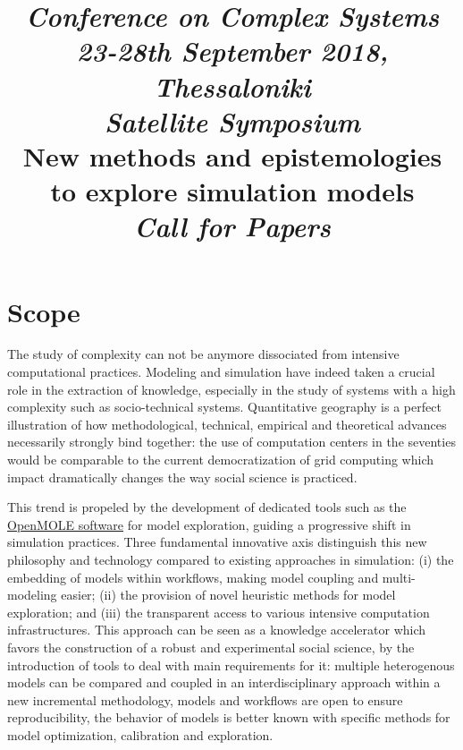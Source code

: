 \documentclass[11pt]{article}
\begin{document}
% 



\title{
\textit{Conference on Complex Systems}\medskip\\
\textit{23-28th September 2018, Thessaloniki}\vspace{1cm}\\
\textit{Satellite Symposium}\medskip\\
New methods and epistemologies to explore simulation models\medskip\\
\textit{Call for Papers}
}

\date{}

\maketitle

\justify




\section*{Scope}

The study of complexity can not be anymore dissociated from intensive computational practices. Modeling and simulation have indeed taken a crucial role in the extraction of knowledge, especially in the study of systems with a high complexity such as socio-technical systems. Quantitative geography is a perfect illustration of how methodological, technical, empirical and theoretical advances necessarily strongly bind together: the use of computation centers in the seventies would be comparable to the current democratization of grid computing which impact dramatically changes the way social science is practiced. 

\medskip

This trend is propeled by the development of dedicated tools such as the \href{http://openmole.org/}{OpenMOLE software} for model exploration, guiding a progressive shift in simulation practices. Three fundamental innovative axis distinguish this new philosophy and technology compared to existing approaches in simulation: (i) the embedding of models within workflows, making model coupling and multi-modeling easier; (ii) the provision of novel heuristic methods for model exploration; and (iii) the transparent access to various intensive computation infrastructures. This approach can be seen as a knowledge accelerator which favors the construction of a robust and experimental social science, by the introduction of tools to deal with main requirements for it: multiple heterogenous models can be compared and coupled in an interdisciplinary approach within a new incremental methodology, models and workflows are open to ensure reproducibility, the behavior of models is better known with specific methods for model optimization, calibration and exploration. 
\end{document}
